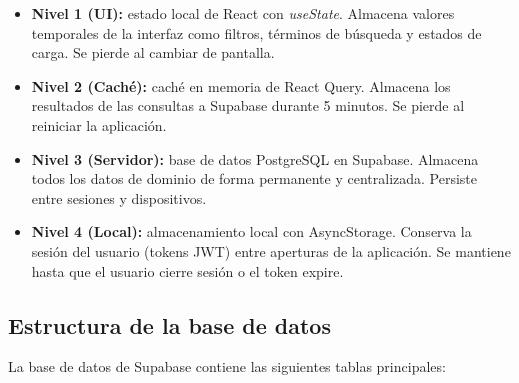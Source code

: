 \begin{itemize}
  \item \textbf{Nivel 1 (UI):} estado local de React con
    \textit{useState}. Almacena valores temporales de la interfaz
    como filtros, t\'erminos de b\'usqueda y estados de carga.
    Se pierde al cambiar de pantalla.

  \item \textbf{Nivel 2 (Cach\'e):} cach\'e en memoria de React
    Query. Almacena los resultados de las consultas a Supabase
    durante 5 minutos. Se pierde al reiniciar la aplicaci\'on.

  \item \textbf{Nivel 3 (Servidor):} base de datos PostgreSQL
    en Supabase. Almacena todos los datos de dominio de forma
    permanente y centralizada. Persiste entre sesiones y
    dispositivos.

  \item \textbf{Nivel 4 (Local):} almacenamiento local con
    AsyncStorage. Conserva la sesi\'on del usuario (tokens JWT)
    entre aperturas de la aplicaci\'on. Se mantiene hasta que
    el usuario cierre sesi\'on o el token expire.
\end{itemize}

\subsection{Estructura de la base de datos}

La base de datos de Supabase contiene las siguientes tablas
principales:

